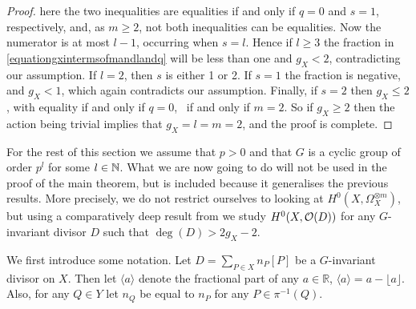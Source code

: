 \begin{proof}
    here the two inequalities are equalities if and only if $q=0$ and $s=1$, respectively, and, as $m\geq 2$, not both inequalities can be equalities.
    Now the numerator is at most $l-1$, occurring when $s=l$. 
    Hence if $l\geq 3$ the fraction in \eqref{equationgxintermsofmandlandq} will be less than one and $g_X < 2$, contradicting our assumption.
    If $l=2$, then $s$ is either 1 or 2.
    If $s=1$ the fraction is negative, and $g_X<1$, which again contradicts our assumption.
    Finally, if $s=2$ then $g_X\leq 2$, with equality if and only if $q=0$, \ie~if and only if $m=2$.
    So if $g_X \geq 2$ then the action being trivial implies that $g_X=l=m=2$, and the proof is complete.    
    \end{proof}

For the rest of this section we assume that $p>0$ and that $G$ is a cyclic group of order $p^l$ for some $l \in {\mathbb N}$.
What we are now going to do will not be used in the proof of the main theorem, but is included because it generalises the previous results.
More precisely, we do not restrict ourselves to looking at $H^0(X,\Omega_X^{\otimes m})$, but using a comparatively deep result from \cite{kako} we study $H^0(X,{\cal O}(D))$ for any $G$-invariant divisor $D$ such that $\deg(D)>2g_X-2$.


We first introduce some notation.
Let $D = \sum_{P\in X} n_P[P]$ be a $G$-invariant divisor on $X$.
Then let $\langle a \rangle$ denote the fractional part of any $a\in \mathbb{R}$, \ie $\langle a \rangle = a - \lfloor a \rfloor$.
Also, for any $Q\in Y$ let $n_Q$ be equal to $n_P$ for any $P\in \pi^{-1}(Q)$.




